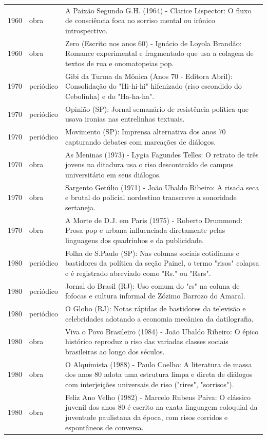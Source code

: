 \begin{longtable}{p{}p{}p{}}
1960 & obra & A Paixão Segundo G.H. (1964) - Clarice Lispector: O fluxo de consciência foca no sorriso mental ou irônico introspectivo. \\
1960 & obra & Zero (Escrito nos anos 60) - Ignácio de Loyola Brandão: Romance experimental e fragmentado que usa a colagem de textos de rua e onomatopeias pop. \\
1970 & periódico & Gibi da Turma da Mônica (Anos 70 - Editora Abril): Consolidação do "Hi-hi-hi" hifenizado (riso escondido do Cebolinha) e do "Ha-ha-ha". \\
1970 & periódico & Opinião (SP): Jornal semanário de resistência política que usava ironias nas entrelinhas textuais. \\
1970 & periódico & Movimento (SP): Imprensa alternativa dos anos 70 capturando debates com marcações de diálogos. \\
1970 & obra & As Meninas (1973) - Lygia Fagundes Telles: O retrato de três jovens na ditadura usa o riso descontraído de campus universitário em seus diálogos. \\
1970 & obra & Sargento Getúlio (1971) - João Ubaldo Ribeiro: A risada seca e brutal do policial nordestino transcreve a sonoridade sertaneja. \\
1970 & obra & A Morte de D.J. em Paris (1975) - Roberto Drummond: Prosa pop e urbana influenciada diretamente pelas linguagens dos quadrinhos e da publicidade. \\
1980 & periódico & Folha de S.Paulo (SP): Nas colunas sociais cotidianas e bastidores da política da seção Painel, o termo "risos" colapsa e é registrado abreviado como "Rs." ou "Rsrs". \\
1980 & periódico & Jornal do Brasil (RJ): Uso comum do "rs" na coluna de fofocas e cultura informal de Zózimo Barrozo do Amaral. \\
1980 & periódico & O Globo (RJ): Notas rápidas de bastidores da televisão e celebridades adotando a economia mecânica da datilografia. \\
1980 & obra & Viva o Povo Brasileiro (1984) - João Ubaldo Ribeiro: O épico histórico reproduz o riso das variadas classes sociais brasileiras ao longo dos séculos. \\
1980 & obra & O Alquimista (1988) - Paulo Coelho: A literatura de massa dos anos 80 adota uma estrutura limpa e direta de diálogos com interjeições universais de riso ("rires", "sorrisos"). \\
1980 & obra & Feliz Ano Velho (1982) - Marcelo Rubens Paiva: O clássico juvenil dos anos 80 é escrito na exata linguagem coloquial da juventude paulistana da época, com risos corridos e espontâneos de conversa. \\

\end{longtable}
